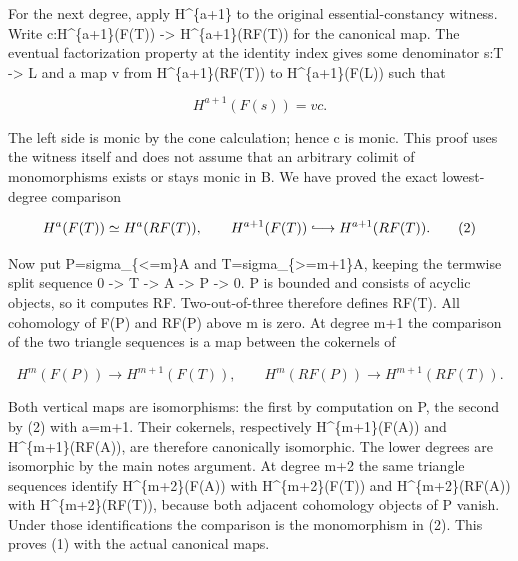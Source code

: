 \documentclass[11pt]{article}
\begin{document}
For the next degree,\allowbreak{} apply H\textasciicircum{}\{a\allowbreak{}+1\} to the original essential-constancy witness. Write c:\allowbreak{}H\textasciicircum{}\{a\allowbreak{}+1\}(F(T)\allowbreak{})\allowbreak{} \allowbreak{}-> H\textasciicircum{}\{a\allowbreak{}+1\}(RF(T)\allowbreak{})\allowbreak{} for the canonical map. The eventual factorization property at the identity index gives some denominator s:\allowbreak{}T \allowbreak{}-> L and a map v from H\textasciicircum{}\{a\allowbreak{}+1\}(RF(T)\allowbreak{})\allowbreak{} to H\textasciicircum{}\{a\allowbreak{}+1\}(F(L)\allowbreak{})\allowbreak{} such that

\[
 H^{a+1}(F(s))=v c.
\]

The left side is monic by the cone calculation; hence c is monic. This proof uses the witness itself and does not assume that an arbitrary colimit of monomorphisms exists or stays monic in B. We have proved the exact lowest-degree comparison

\[
 H^a(F(T))\simeq H^a(RF(T)),\qquad
 H^{a+1}(F(T))\lhook\joinrel\longrightarrow H^{a+1}(RF(T)). \tag{2}
\]

Now put P\allowbreak{}=sigma\_\allowbreak{}\{<\allowbreak{}=m\}A and T\allowbreak{}=sigma\_\allowbreak{}\{>\allowbreak{}=m\allowbreak{}+1\}A,\allowbreak{} keeping the termwise split sequence 0 \allowbreak{}-> T \allowbreak{}-> A \allowbreak{}-> P \allowbreak{}-> 0. P is bounded and consists of acyclic objects,\allowbreak{} so it computes RF. Two-out-of-three therefore defines RF(T)\allowbreak{}. All cohomology of F(P)\allowbreak{} and RF(P)\allowbreak{} above m is zero. At degree m\allowbreak{}+1 the comparison of the two triangle sequences is a map between the cokernels of

\[
 H^m(F(P))\longrightarrow H^{m+1}(F(T)),
 \qquad
 H^m(RF(P))\longrightarrow H^{m+1}(RF(T)).
\]

Both vertical maps are isomorphisms:\allowbreak{} the first by computation on P,\allowbreak{} the second by (2)\allowbreak{} with a\allowbreak{}=m\allowbreak{}+1. Their cokernels,\allowbreak{} respectively H\textasciicircum{}\{m\allowbreak{}+1\}(F(A)\allowbreak{})\allowbreak{} and H\textasciicircum{}\{m\allowbreak{}+1\}(RF(A)\allowbreak{})\allowbreak{},\allowbreak{} are therefore canonically isomorphic. The lower degrees are isomorphic by the main note\textquotesingle s argument. At degree m\allowbreak{}+2 the same triangle sequences identify H\textasciicircum{}\{m\allowbreak{}+2\}(F(A)\allowbreak{})\allowbreak{} with H\textasciicircum{}\{m\allowbreak{}+2\}(F(T)\allowbreak{})\allowbreak{} and H\textasciicircum{}\{m\allowbreak{}+2\}(RF(A)\allowbreak{})\allowbreak{} with H\textasciicircum{}\{m\allowbreak{}+2\}(RF(T)\allowbreak{})\allowbreak{},\allowbreak{} because both adjacent cohomology objects of P vanish. Under those identifications the comparison is the monomorphism in (2)\allowbreak{}. This proves (1)\allowbreak{} with the actual canonical maps.
\end{document}
